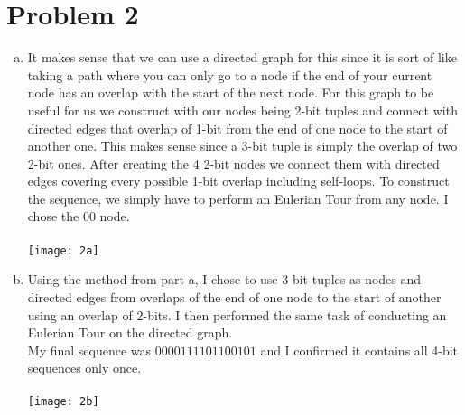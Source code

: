 \documentclass[11pt,letterpaper]{article}
\begin{document}
\section*{Problem 2}
\begin{enumerate}[(a)]
\item
It makes sense that we can use a directed graph for this since it is sort of like taking a path where you can only go to a node if the end of your current node has an overlap with the start of the next node. For this graph to be useful for us we construct with our nodes being 2-bit tuples and connect with directed edges that overlap of 1-bit from the end of one node to the start of another one. This makes sense since a 3-bit tuple is simply the overlap of two 2-bit ones. After creating the 4 2-bit nodes we connect them with directed edges covering every possible 1-bit overlap including self-loops. To construct the sequence, we simply have to perform an Eulerian Tour from any node. I chose the 00 node.\\\\
\texttt{[image: 2a]}
\clearpage
\item
Using the method from part a, I chose to use 3-bit tuples as nodes and directed edges from overlaps of the end of one node to the start of another using an overlap of 2-bits. I then performed the same task of conducting an Eulerian Tour on the directed graph. \\
My final sequence was $0000111101100101$ and I confirmed it contains all 4-bit sequences only once.\\\\
\texttt{[image: 2b]}
\\
\end{enumerate}
\clearpage
\end{document}
